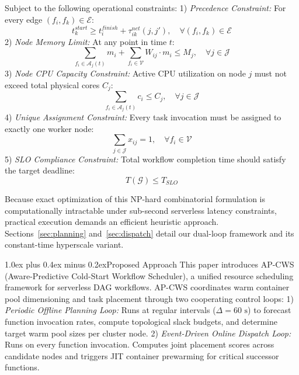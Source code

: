 \documentclass[conference]{IEEEtran}
\makeatletter
\def\section{\@startsection{section}{1}{\z@}{2.4ex plus 1.0ex minus 0.5ex}%
{1.0ex plus 0.4ex minus 0.2ex}{\normalfont\large\bfseries\color{ieeeblue}}}
\makeatother
\begin{document}
Subject to the following operational constraints:
1) \textit{Precedence Constraint:} For every edge $(f_i, f_k) \in \mathcal{E}$:
\begin{equation}
t_k^{start} \ge t_i^{finish} + \tau_{ik}^{net}(j, j'), \quad \forall (f_i, f_k) \in \mathcal{E}
\end{equation}
2) \textit{Node Memory Limit:} At any point in time $t$:
\begin{equation}
\sum_{f_i \in \mathcal{A}_j(t)} m_i + \sum_{f_i \in \mathcal{V}} W_{ij} \cdot m_i \le M_j, \quad \forall j \in \mathcal{J}
\end{equation}
3) \textit{Node CPU Capacity Constraint:} Active CPU utilization on node $j$ must not exceed total physical cores $C_j$:
\begin{equation}
\sum_{f_i \in \mathcal{A}_j(t)} c_i \le C_j, \quad \forall j \in \mathcal{J}
\end{equation}
4) \textit{Unique Assignment Constraint:} Every task invocation must be assigned to exactly one worker node:
\begin{equation}
\sum_{j \in \mathcal{J}} x_{ij} = 1, \quad \forall f_i \in \mathcal{V}
\end{equation}
5) \textit{SLO Compliance Constraint:} Total workflow completion time should satisfy the target deadline:
\begin{equation}
T(\mathcal{G}) \le T_{SLO}
\end{equation}

Because exact optimization of this NP-hard combinatorial formulation is computationally intractable under sub-second serverless latency constraints, practical execution demands an efficient heuristic approach. Sections~\ref{sec:planning} and~\ref{sec:dispatch} detail our dual-loop framework and its constant-time hyperscale variant.

\section{Proposed Approach}
\label{sec:approach}
This paper introduces AP-CWS (Aware-Predictive Cold-Start Workflow Scheduler), a unified resource scheduling framework for serverless DAG workflows. AP-CWS coordinates warm container pool dimensioning and task placement through two cooperating control loops:
1) \textit{Periodic Offline Planning Loop:} Runs at regular intervals ($\Delta = 60\text{ s}$) to forecast function invocation rates, compute topological slack budgets, and determine target warm pool sizes per cluster node.
2) \textit{Event-Driven Online Dispatch Loop:} Runs on every function invocation. Computes joint placement scores across candidate nodes and triggers JIT container prewarming for critical successor functions.
\end{document}

